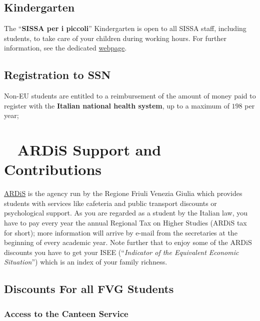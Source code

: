 \documentclass{sissavademecum}
\begin{document}
   
\section{Kindergarten}

The ``\textbf{SISSA per i piccoli}{}'' Kindergarten is open to all SISSA staff, including students, to take care of your children during working hours. For further information, see the dedicated \href{https://www.sissa.it/kindergarten}{webpage}.
   
    
\section{Registration to SSN}

Non-EU students are entitled to a reimbursement of the amount of money paid to register with the \textbf{Italian national health system}, up to a maximum of \EUR{} $198$ per year;
    



\chapter{\texorpdfstring{\faTags\ }{} ARDiS Support and Contributions}
\hypertarget{ARDiS}{}
\label{chap:ARDiS}

\href{http://www.ardiss.fvg.it}{ARDiS} is the agency run by the Regione Friuli Venezia Giulia which provides students with services like cafeteria and public transport discounts or psychological support. As you are regarded as a student by the Italian law, you have to pay every year the annual Regional Tax on Higher Studies (ARDiS tax for short); more information will arrive by e-mail from the secretaries at the beginning of every academic year. Note further that to enjoy some of the ARDiS discounts you have to get your ISEE (``\emph{Indicator of the Equivalent Economic Situation}'') which is an index of your family richness.


\section{Discounts For all FVG Students}


\subsection{Access to the Canteen Service}
\end{document}
